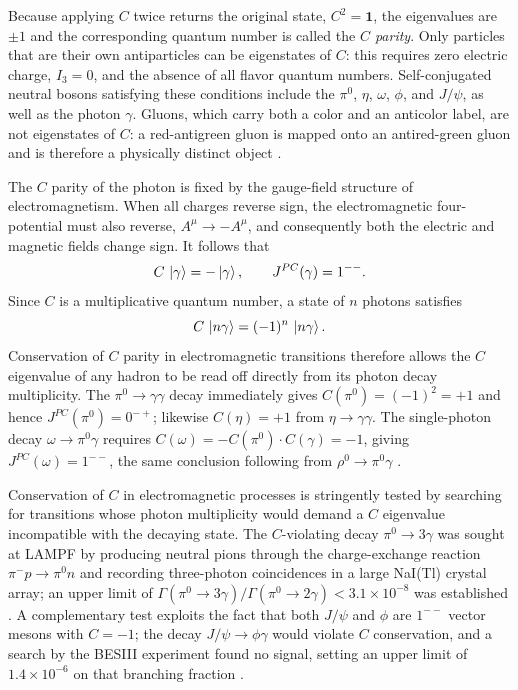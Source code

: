Because applying $C$ twice returns the original state, $C^2 = \mathbf{1}$, the
eigenvalues are $\pm 1$ and the corresponding quantum number is called the
\emph{$C$ parity}. Only particles that are their own antiparticles can be
eigenstates of $C$: this requires zero electric charge, $I_3 = 0$, and the absence
of all flavor quantum numbers. Self-conjugated neutral bosons satisfying these
conditions include the $\pi^0$, $\eta$, $\omega$, $\phi$, and $J/\psi$, as well as
the photon $\gamma$. Gluons, which carry both a color and an anticolor label,
are not eigenstates of $C$: a red-antigreen gluon is mapped onto an antired-green
gluon and is therefore a physically distinct object \cite[Ch.~3]{Amsler2018}.
 
The $C$ parity of the photon is fixed by the gauge-field structure of
electromagnetism. When all charges reverse sign, the electromagnetic four-potential
must also reverse, $A^\mu \to -A^\mu$, and consequently both the electric and
magnetic fields change sign. It follows that
\begin{equation}
    C\,\ket{\gamma} = -\ket{\gamma},
    \qquad J^{PC}(\gamma) = 1^{--}.
    \label{eq:photon_Cparity}
\end{equation}
Since $C$ is a multiplicative quantum number, a state of $n$ photons satisfies
\begin{equation}
    C\,\ket{n\gamma} = (-1)^n\,\ket{n\gamma}.
    \label{eq:ngamma_Cparity}
\end{equation}
Conservation of $C$ parity in electromagnetic transitions therefore allows the
$C$ eigenvalue of any hadron to be read off directly from its photon decay
multiplicity. The $\pi^0 \to \gamma\gamma$ decay immediately gives $C(\pi^0) =
(-1)^2 = +1$ and hence $J^{PC}(\pi^0) = 0^{-+}$; likewise $C(\eta) = +1$ from
$\eta \to \gamma\gamma$. The single-photon decay $\omega \to \pi^0\gamma$
requires $C(\omega) = -C(\pi^0)\cdot C(\gamma) = -1$, giving $J^{PC}(\omega) =
1^{--}$, the same conclusion following from $\rho^0 \to \pi^0\gamma$
\cite[Ch.~3]{Amsler2018}.
 
Conservation of $C$ in electromagnetic processes is stringently tested by searching
for transitions whose photon multiplicity would demand a $C$ eigenvalue incompatible
with the decaying state. The $C$-violating decay $\pi^0 \to 3\gamma$ was sought at
LAMPF by producing neutral pions through the charge-exchange reaction
$\pi^-p \to \pi^0 n$ and recording three-photon coincidences in a large NaI(Tl)
crystal array; an upper limit of
$\Gamma(\pi^0 \to 3\gamma)/\Gamma(\pi^0 \to 2\gamma) < 3.1 \times 10^{-8}$ was
established \cite[Ch.~3]{Amsler2018}. A complementary test exploits the fact that
both $J/\psi$ and $\phi$ are $1^{--}$ vector mesons with $C = -1$; the decay
$J/\psi \to \phi\gamma$ would violate $C$ conservation, and a search by the BESIII
experiment found no signal, setting an upper limit of $1.4 \times 10^{-6}$ on that
branching fraction \cite[Ch.~3]{Amsler2018}.
 

